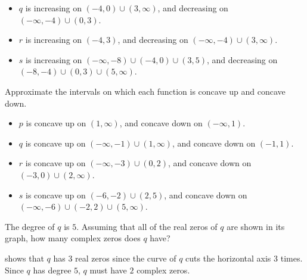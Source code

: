 \begin{exercises}
\begin{problem}
\begin{subproblem}
\begin{shortsolution}
\begin{itemize}
      \item $q$ is increasing on $(-4,0)\cup (3,\infty)$, and decreasing on $(-\infty,-4)\cup (0,3)$.
      \item $r$ is increasing on $(-4,3)$, and decreasing on $(-\infty,-4)\cup (3,\infty)$.
      \item $s$ is increasing on $(-\infty,-8)\cup (-4,0)\cup (3,5)$, and decreasing on $(-8,-4)\cup (0,3)\cup (5,\infty)$.
     \end{itemize}
    \end{shortsolution}
\end{subproblem}
\begin{subproblem}
Approximate the intervals on which each function is concave up and concave down.
    \begin{shortsolution}
        \begin{itemize}
         \item $p$ is concave up on  $(1,\infty)$, and concave down on  $(-\infty,1)$.
         \item $q$ is concave up on $(-\infty,-1)\cup (1,\infty)$, and concave down on $(-1,1)$.
         \item $r$ is concave up on $(-\infty,-3)\cup (0,2)$, and concave down on $(-3,0)\cup (2,\infty)$.
         \item $s$ is concave up on $(-6,-2)\cup (2,5)$, and concave down on $(-\infty,-6)\cup (-2,2)\cup (5,\infty)$.
        \end{itemize}
    \end{shortsolution}
\end{subproblem}
\begin{subproblem}
The degree of $q$ is $5$. Assuming that all of the real zeros of $q$ are
shown in its graph, how many complex zeros does $q$ have?
     \begin{shortsolution}
     shows that $q$ has $3$ real zeros 
    since the curve of $q$ cuts the horizontal axis $3$ times. 
    Since $q$ has degree $5$, $q$ must have $2$ complex zeros.
     \end{shortsolution}
\end{subproblem}
\end{problem}


\end{exercises}
